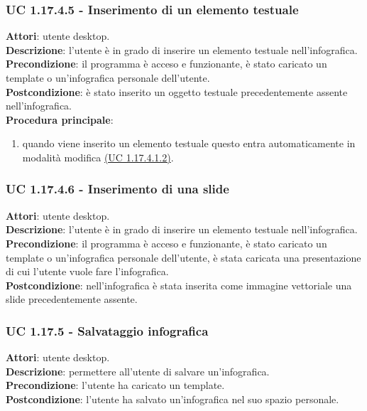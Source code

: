 {\subsubsection{UC 1.17.4.5 - Inserimento di un elemento testuale}{
	\label{uc1.17.4.5}
	\textbf{Attori}: utente desktop. \\
	\textbf{Descrizione}: l'utente è in grado di inserire un elemento testuale nell'infografica. \\
	\textbf{Precondizione}: il programma è acceso e funzionante, è stato caricato un template o un'infografica personale dell'utente.	\\
	\textbf{Postcondizione}: è stato inserito un oggetto testuale precedentemente assente nell'infografica.	\\
	\textbf{Procedura principale}:
	\begin{enumerate}
		\item quando viene inserito un elemento testuale questo entra automaticamente in modalità modifica \hyperref[uc1.17.4.1.2]{(UC 1.17.4.1.2)}.
	\end{enumerate}
	}
\subsubsection{UC 1.17.4.6 - Inserimento di una slide}{
	\label{uc1.17.4.6}
	\textbf{Attori}: utente desktop. \\
	\textbf{Descrizione}: l'utente è in grado di inserire un elemento testuale nell'infografica. \\
	\textbf{Precondizione}: il programma è acceso e funzionante, è stato caricato un template o un'infografica personale dell'utente, è stata caricata una presentazione di cui l'utente vuole fare l'infografica.	\\
	\textbf{Postcondizione}: nell'infografica è stata inserita come immagine vettoriale una slide precedentemente assente.	\\
	}
\subsubsection{UC 1.17.5 - Salvataggio infografica}{
	\label{uc1.17.5}
	\textbf{Attori}: utente desktop. \\
	\textbf{Descrizione}: permettere all’utente di salvare un’infografica. \\
	\textbf{Precondizione}: l'utente ha caricato un template.	\\
	\textbf{Postcondizione}: l'utente ha salvato un’infografica nel suo spazio personale.	\\
	}
}
